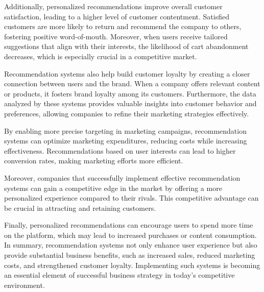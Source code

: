 \documentclass[10pt,twoside,slovak,a4paper]{article}
\begin{document}
Additionally, personalized recommendations improve overall customer satisfaction\cite{user}, leading to a higher level of customer contentment. Satisfied customers are more likely to return and recommend the company to others, fostering positive word-of-mouth. Moreover, when users receive tailored suggestions that align with their interests, the likelihood of cart abandonment decreases, which is especially crucial in a competitive market.

Recommendation systems also help build customer loyalty by creating a closer connection between users and the brand\cite{user}. When a company offers relevant content or products, it fosters brand loyalty among its customers. Furthermore, the data analyzed by these systems provides valuable insights into customer behavior and preferences, allowing companies to refine their marketing strategies effectively.

By enabling more precise targeting in marketing campaigns, recommendation systems can optimize marketing expenditures, reducing costs while increasing effectiveness\cite{comerce}. Recommendations based on user interests can lead to higher conversion rates, making marketing efforts more efficient\cite{user}.

Moreover, companies that successfully implement effective recommendation systems can gain a competitive edge in the market by offering a more personalized experience compared to their rivals\cite{comerce}. This competitive advantage can be crucial in attracting and retaining customers.

Finally, personalized recommendations can encourage users to spend more time on the platform\cite{experience}, which may lead to increased purchases or content consumption. In summary, recommendation systems not only enhance user experience but also provide substantial business benefits, such as increased sales, reduced marketing costs, and strengthened customer loyalty. Implementing such systems is becoming an essential element of successful business strategy in today’s competitive environment.


\newpage
\end{document}
